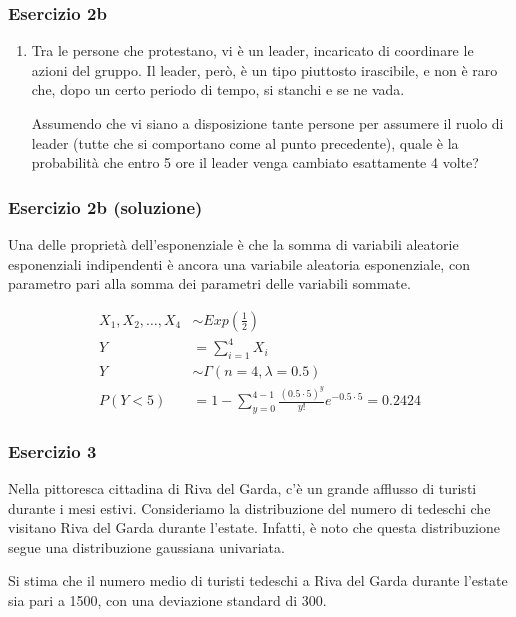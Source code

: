 \documentclass{beamer}
\begin{document}
\begin{frame}[fragile]
	\frametitle{Esercizio 2b}

	\begin{enumerate}[b]
		\item Tra le persone che protestano, vi è un leader, incaricato di coordinare le azioni del gruppo. Il leader, però, è un tipo piuttosto irascibile, e non è raro che, dopo un certo periodo di tempo, si stanchi e se ne vada.
		
		Assumendo che vi siano a disposizione tante persone per assumere il ruolo di leader (tutte che si comportano come al punto precedente), quale è la probabilità che entro 5 ore il leader venga cambiato esattamente 4 volte?
	\end{enumerate}
\end{frame}


\begin{frame}[fragile]
	\frametitle{Esercizio 2b (soluzione)}

	Una delle proprietà dell'esponenziale è che la somma di variabili aleatorie esponenziali indipendenti è ancora una variabile aleatoria esponenziale, con parametro pari alla somma dei parametri delle variabili sommate.

	\begin{align*}
		X_1, X_2, \dots, X_{4} & \sim Exp(\frac{1}{2}) \\
		Y & = \sum_{i=1}^{4} X_i \\
		Y & \sim \Gamma(n = 4, \lambda = 0.5) \\
		P(Y < 5) & = 1 - \sum_{y=0}^{4 - 1} \frac{(0.5 \cdot 5)^y}{y!}e^{-0.5 \cdot 5} = 0.2424 
	\end{align*}

\end{frame}

\begin{frame}[fragile]
	\frametitle{Esercizio 3}
	Nella pittoresca cittadina di Riva del Garda, c'è un grande afflusso di turisti durante i mesi estivi. Consideriamo la distribuzione del numero di tedeschi che visitano Riva del Garda durante l'estate. Infatti, è noto che questa distribuzione segue una distribuzione gaussiana univariata.

	\medskip

	Si stima che il numero medio di turisti tedeschi a Riva del Garda durante l'estate sia pari a 1500, con una deviazione standard di 300.
\end{frame}
\end{document}
